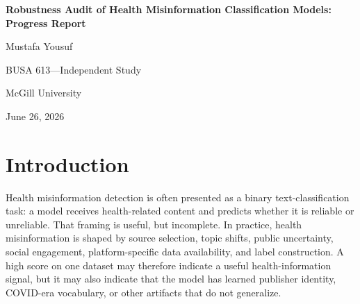 \documentclass[12pt]{article}
\begin{document}
\begin{titlepage}
    \centering
    \vspace*{1.25in}
    {\Large\textbf{Robustness Audit of Health Misinformation Classification Models: Progress Report}\par}
    \vspace{0.75in}
    {Mustafa Yousuf\par}
    \vspace{0.25in}
    {BUSA 613---Independent Study\par}
    \vspace{0.25in}
    {McGill University\par}
    \vspace{0.25in}
    {June 26, 2026\par}
    \vfill
\end{titlepage}

\clearpage

\begin{abstract}
\noindent Health misinformation classifiers are often evaluated through aggregate within-dataset accuracy, but such results may reflect dataset artifacts rather than robust health-information signals. This progress report describes the first half of a study evaluating whether traditional machine-learning and transformer-based models can classify dataset-defined unreliable health information under standard and artifact-controlled conditions. CoAID is used as the primary COVID-19 health-information dataset, and FakeHealth is used as a secondary broader health-news dataset. Completed work includes data acquisition, provenance auditing, label harmonization, processed-table construction, leakage-aware split generation, engagement-feasibility assessment, and traditional text baselines. The current results show strong CoAID baseline performance and lower FakeHealth performance, indicating that task difficulty and label provenance differ substantially across datasets. Transformer evaluation is implemented but remains pending because the local environment lacks the required transformer dependencies.
\end{abstract}

\section*{Introduction}

Health misinformation detection is often presented as a binary text-classification task: a model receives health-related content and predicts whether it is reliable or unreliable. That framing is useful, but incomplete. In practice, health misinformation is shaped by source selection, topic shifts, public uncertainty, social engagement, platform-specific data availability, and label construction. A high score on one dataset may therefore indicate a useful health-information signal, but it may also indicate that the model has learned publisher identity, COVID-era vocabulary, or other artifacts that do not generalize.
\end{document}
